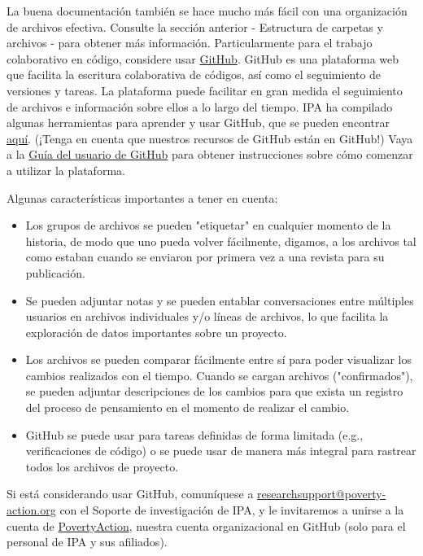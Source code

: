 \documentclass[11pt,en]{elegantpaper}
\begin{document}
\begin{enumerate}
La buena documentación también se hace mucho más fácil con una organización de archivos efectiva. Consulte la sección anterior - Estructura de carpetas y archivos - para obtener más información. Particularmente para el trabajo colaborativo en código, considere usar \href{https://github.com/}{GitHub}. GitHub es una plataforma web que facilita la escritura colaborativa de códigos, así como el seguimiento de versiones y tareas. La plataforma puede facilitar en gran medida el seguimiento de archivos e información sobre ellos a lo largo del tiempo. IPA ha compilado algunas herramientas para aprender y usar GitHub, que se pueden encontrar \href{https://github.com/PovertyAction/github-training}{aquí}. (¡Tenga en cuenta que nuestros recursos de GitHub están en GitHub!) Vaya a la \href{https://github.com/PovertyAction/github-training/blob/master/resources/GitHub\%20User\%20Guide.md}{Guía del usuario de GitHub} para obtener instrucciones sobre cómo comenzar a utilizar la plataforma.

Algunas características importantes a tener en cuenta:

\begin{itemize}
	\item Los grupos de archivos se pueden "etiquetar" en cualquier momento de la historia, de modo que uno pueda volver fácilmente, digamos, a los archivos tal como estaban cuando se enviaron por primera vez a una revista para su publicación.
	
	\item Se pueden adjuntar notas y se pueden entablar conversaciones entre múltiples usuarios en archivos individuales y/o líneas de archivos, lo que facilita la exploración de datos importantes sobre un proyecto.
	
	\item Los archivos se pueden comparar fácilmente entre sí para poder visualizar los cambios realizados con el tiempo. Cuando se cargan archivos ("confirmados"), se pueden adjuntar descripciones de los cambios para que exista un registro del proceso de pensamiento en el momento de realizar el cambio.
	
	\item GitHub se puede usar para tareas definidas de forma limitada (e.g., verificaciones de código) o se puede usar de manera más integral para rastrear todos los archivos de proyecto.
\end{itemize}

Si está considerando usar GitHub, comuníquese a \href{mailto:researchsupport@poverty-action.org}{researchsupport@poverty-action.org} con el Soporte de investigación de IPA, y le invitaremos a unirse a la cuenta de \href{https://github.com/PovertyAction}{PovertyAction}, nuestra cuenta organizacional en GitHub (solo para el personal de IPA y sus afiliados).


\end{enumerate}
\end{document}
